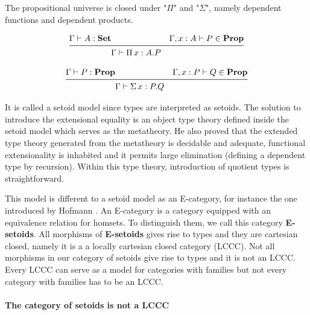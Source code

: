 The propositional universe is closed under "$\Pi$" and "$\Sigma$", namely dependent functions
and dependent products.

\begin{equation}[\Pi-Prop]
\begin{aligned}
\Gamma \vdash A : \textbf{Set} & & \Gamma,x : A \vdash P \in \textbf{Prop} & \\
\midrule
& \Gamma \vdash \Pi\, x : A.P & \\
\end{aligned}
\end{equation}



\begin{equation}[\Sigma-Prop]
\begin{aligned}
\Gamma \vdash P : \textbf{Prop} & & \Gamma,x : P \vdash Q \in \textbf{Prop} & \\
\midrule
& \Gamma \vdash \Sigma\, x : P.Q & \\
\end{aligned}
\end{equation}



 It is called a setoid model since types are interpreted as setoids.
The solution to introduce the extensional equality is an object type theory defined inside the setoid model which serves as the metatheory. He also proved that the extended type theory generated from the metatheory is decidable and adequate, functional extensionality is
inhabited and it permits large elimination (defining a dependent type by recursion). Within this type theory,
introduction of quotient types is straightforward.

This model is different to a setoid model as an E-category, for instance
the one introduced by Hofmann \cite{hofmann1995interpretation} . An E-category is a category equipped with
an equivalence relation for homsets. To distinguish them, we call this
category \textbf{E-setoids}.  All morphisms of \textbf{E-setoids}
gives rise to types and they are cartesian closed, namely it is a a locally
cartesian closed category (LCCC). Not all morphisms in our category of setoids give
rise to types and it is not an LCCC. Every LCCC can serve as a model for categories with
families but not every category with families has to be an
LCCC. 




\paragraph{The category of setoids is not a LCCC}

